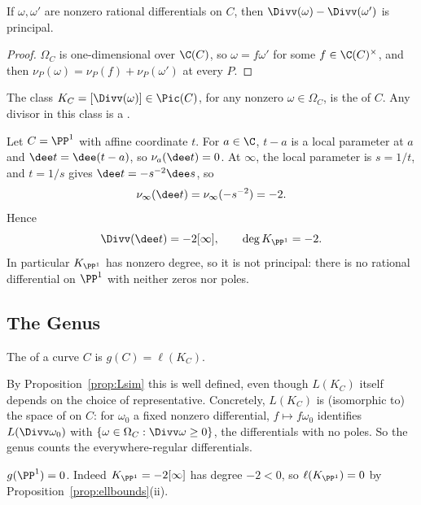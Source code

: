 \begin{proposition}
	If $\omega,\omega'$ are nonzero rational differentials on $C$, then $\Divv(\omega) - \Divv(\omega')$ is principal.
\end{proposition}

\begin{proof}
	$\Omega_C$ is one-dimensional over $\C(C)$, so $\omega = f\omega'$ for some $f \in \C(C)^\times$, and then $\nu_P(\omega) = \nu_P(f) + \nu_P(\omega')$ at every $P$.
\end{proof}

\begin{definition}
	The class $K_C = [\Divv(\omega)] \in \Pic(C)$, for any nonzero $\omega \in \Omega_C$, is the  of $C$. Any divisor in this class is a .
\end{definition}

\begin{example}\label{ex:divdt}
	Let $C = \PP^1$ with affine coordinate $t$. For $a \in \C$, $t - a$ is a local parameter at $a$ and $\dee t = \dee(t-a)$, so $\nu_a(\dee t) = 0$. At $\infty$, the local parameter is $s = 1/t$, and $t = 1/s$ gives $\dee t = -s^{-2}\dee s$, so
	$$\nu_\infty(\dee t) = \nu_\infty(-s^{-2}) = -2.$$
	Hence
	$$\Divv(\dee t) = -2[\infty], \qquad \deg K_{\PP^1} = -2.$$
	In particular $K_{\PP^1}$ has nonzero degree, so it is not principal: there is no rational differential on $\PP^1$ with neither zeros nor poles.
\end{example}

\subsection{The Genus}

\begin{definition}[Genus]
	The  of a curve $C$ is $g(C) = \ell(K_C)$.
\end{definition}

By Proposition~\ref{prop:Lsim} this is well defined, even though $L(K_C)$ itself depends on the choice of representative. Concretely, $L(K_C)$ is (isomorphic to) the space of  on $C$: for $\omega_0$ a fixed nonzero differential, $f \mapsto f\omega_0$ identifies $L(\Divv\omega_0)$ with $\{\omega \in \Omega_C : \Divv\omega \geq 0\}$, the differentials with no poles. So the genus counts the everywhere-regular differentials.

\begin{example}
	$g(\PP^1) = 0$. Indeed $K_{\PP^1} = -2[\infty]$ has degree $-2 < 0$, so $\ell(K_{\PP^1}) = 0$ by Proposition~\ref{prop:ellbounds}(ii).
\end{example}

